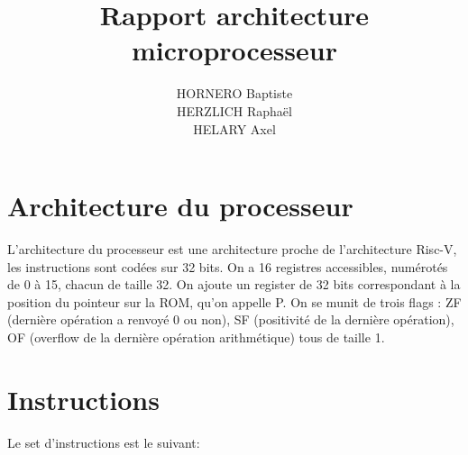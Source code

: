 \documentclass{article}
\title{Rapport architecture microprocesseur}
\author{HORNERO Baptiste \\ HERZLICH Raphaël \\ HELARY Axel}
\date{}
\begin{document}
\maketitle

\section*{Architecture du processeur}

L'architecture du processeur est une architecture proche de l'architecture Risc-V,
les instructions sont codées sur 32 bits. On a 16 registres accessibles,
numérotés de 0 à 15, chacun de taille 32. On ajoute un register de 32
bits correspondant à la position du pointeur sur la ROM, qu'on appelle P.
On se munit de trois flags : ZF (dernière opération a renvoyé 0 ou non), SF
(positivité de la dernière opération), OF (overflow de la dernière
opération arithmétique) tous de taille 1.


\section*{Instructions}
 
Le set d'instructions est le suivant:
\end{document}
